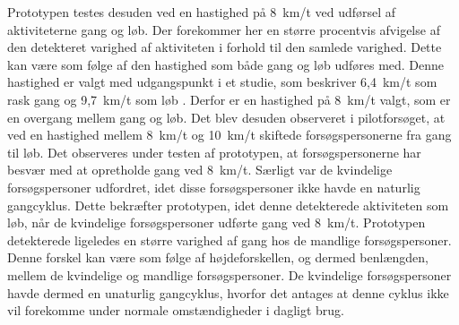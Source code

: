 Prototypen testes desuden ved en hastighed på 8~km/t ved udførsel af aktiviteterne gang og løb. Der forekommer her en større procentvis afvigelse af den detekteret varighed af aktiviteten i forhold til den samlede varighed. Dette kan være som følge af den hastighed som både gang og løb udføres med. Denne hastighed er valgt med udgangspunkt i et studie, som beskriver 6,4~km/t som rask gang og 9,7~km/t som løb \citep{Miles2007}. Derfor er en hastighed på 8~km/t valgt, som er en overgang mellem gang og løb. Det blev desuden observeret i pilotforsøget, at ved en hastighed mellem 8~km/t og 10~km/t skiftede forsøgspersonerne fra gang til løb. Det observeres under testen af prototypen, at forsøgspersonerne har besvær med at opretholde gang ved 8~km/t. Særligt var de kvindelige forsøgspersoner udfordret, idet disse forsøgspersoner ikke havde en naturlig gangcyklus. Dette bekræfter prototypen, idet denne detekterede aktiviteten som løb, når de kvindelige forsøgspersoner udførte gang ved 8~km/t. Prototypen detekterede ligeledes en større varighed af gang hos de mandlige forsøgspersoner. Denne forskel kan være som følge af højdeforskellen, og dermed benlængden, mellem de kvindelige og mandlige forsøgspersoner. De kvindelige forsøgspersoner havde dermed en unaturlig gangcyklus, hvorfor det antages at denne cyklus ikke vil forekomme under normale omstændigheder i dagligt brug.